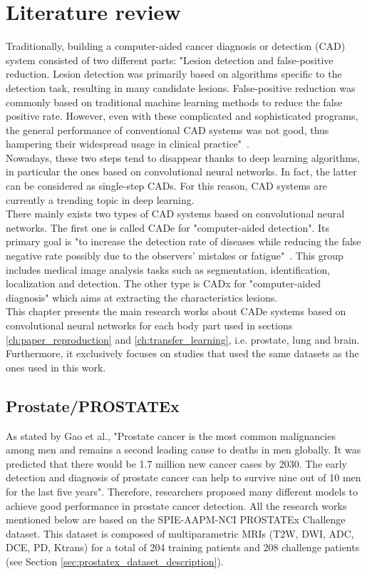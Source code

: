 
\chapter{Literature review}
\label{ch:literature_review}

Traditionally, building a computer-aided cancer diagnosis or detection (CAD) system consisted of two different parts: "Lesion  detection  and  false-positive  reduction.  Lesion  detection  was  primarily  based  on  algorithms  specific  to  the  detection task, resulting in many candidate lesions. False-positive reduction was commonly based on traditional  machine  learning  methods  to  reduce  the  false  positive  rate. However,  even  with  these  complicated and sophisticated programs, the general performance of conventional CAD systems was not good, thus hampering their widespread usage in clinical practice"~\cite{41}.\\
Nowadays, these two steps tend to disappear thanks to deep learning algorithms, in particular the ones based on convolutional neural networks. In fact, the latter can be considered as single-step CADs. For this reason, CAD systems are currently a trending topic in deep learning.\\
There mainly exists two types of CAD systems based on convolutional neural networks. The first one is called CADe for "computer-aided detection". Its primary goal is "to increase the detection rate of diseases while reducing the false negative  rate  possibly  due  to  the  observers’  mistakes  or  fatigue"~\cite{41}. This group includes medical  image  analysis  tasks  such  as  segmentation,  identification,  localization  and  detection. The other type is CADx for "computer-aided diagnosis" which aims at extracting the characteristics lesions.\\
This chapter presents the main research works about CADe systems based on convolutional neural networks for each body part used in sections \ref{ch:paper_reproduction} and \ref{ch:transfer_learning}, i.e. prostate, lung and brain. Furthermore, it exclusively focuses on studies that used the same datasets as the ones used in this work.

\section{Prostate/PROSTATEx}
As stated by Gao et al., "Prostate  cancer  is  the  most  common  malignancies  among  men  and  remains  a  second  leading  cause to deaths in men globally. It was predicted that there would be 1.7 million new cancer cases by 2030. The early detection and diagnosis of prostate cancer can help to survive nine out of 10 men for the last five years"\cite{41}. Therefore, researchers proposed many different models to achieve good performance in prostate cancer detection. All the research works mentioned below are based on the SPIE-AAPM-NCI PROSTATEx Challenge dataset. This dataset is composed of multiparametric MRIs (T2W, DWI, ADC, DCE, PD, Ktrans) for a total of 204 training patients and 208 challenge patients (see Section \ref{sec:prostatex_dataset_description}).

